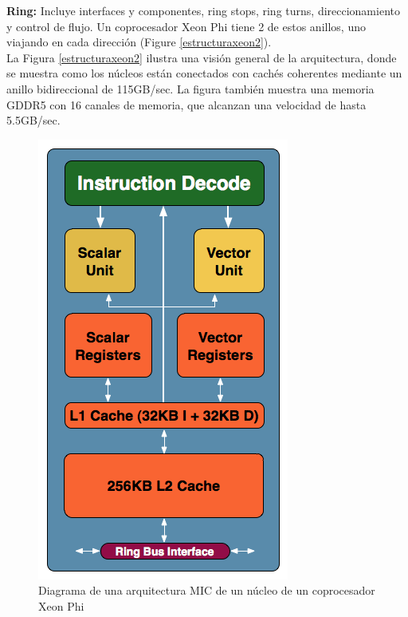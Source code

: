 \textbf{Ring:} Incluye interfaces y componentes, ring stops, ring turns, direccionamiento y control de flujo. Un coprocesador Xeon Phi tiene 2 de estos anillos, uno viajando en cada dirección (Figure \ref{estructuraxeon2}).\\

La Figura \ref{estructuraxeon2} ilustra una visión general de la arquitectura, donde se muestra como los núcleos están conectados con cachés coherentes mediante un anillo bidireccional de 115GB/sec. La figura también muestra una memoria GDDR5 con 16 canales de memoria, que alcanzan una velocidad de hasta 5.5GB/sec.

\begin{figure}[hbtp]
\centering
\label{estructuraxeon}
\includegraphics[scale=0.5]{fig/core.png}
\caption{Diagrama de una arquitectura MIC de un núcleo de un coprocesador Xeon Phi}
\end{figure}

